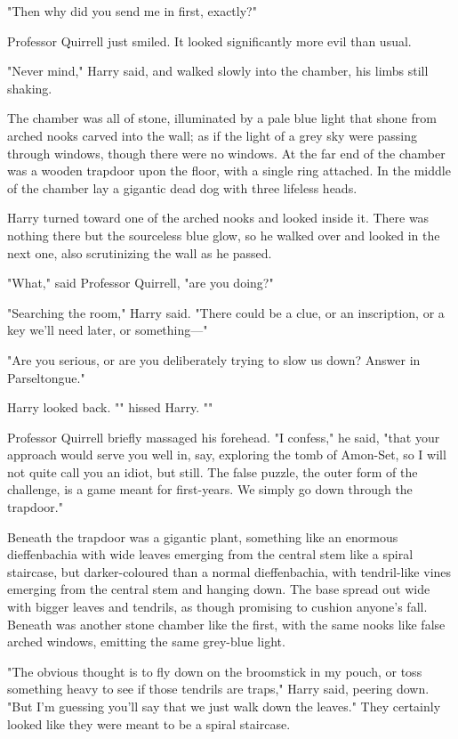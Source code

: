 "Then why did you send me in first, exactly?"

Professor Quirrell just smiled. It looked significantly more evil than usual.

"Never mind," Harry said, and walked slowly into the chamber, his limbs still
shaking.

The chamber was all of stone, illuminated by a pale blue light that shone from
arched nooks carved into the wall; as if the light of a grey sky were passing
through windows, though there were no windows. At the far end of the chamber
was a wooden trapdoor upon the floor, with a single ring attached. In the
middle of the chamber lay a gigantic dead dog with three lifeless heads.

Harry turned toward one of the arched nooks and looked inside it. There was
nothing there but the sourceless blue glow, so he walked over and looked in the
next one, also scrutinizing the wall as he passed.

"What," said Professor Quirrell, "are you doing?"

"Searching the room," Harry said. "There could be a clue, or an inscription, or
a key we'll need later, or something---"

"Are you serious, or are you deliberately trying to slow us down? Answer in
Parseltongue."

Harry looked back. "" hissed Harry. ""

Professor Quirrell briefly massaged his forehead. "I confess," he said, "that
your approach would serve you well in, say, exploring the tomb of Amon-Set, so
I will not quite call you an idiot, but still. The false puzzle, the outer form
of the challenge, is a game meant for first-years. We simply go down through
the trapdoor."

Beneath the trapdoor was a gigantic plant, something like an enormous
dieffenbachia with wide leaves emerging from the central stem like a spiral
staircase, but darker-coloured than a normal dieffenbachia, with tendril-like
vines emerging from the central stem and hanging down. The base spread out wide
with bigger leaves and tendrils, as though promising to cushion anyone's fall.
Beneath was another stone chamber like the first, with the same nooks like
false arched windows, emitting the same grey-blue light.

"The obvious thought is to fly down on the broomstick in my pouch, or toss
something heavy to see if those tendrils are traps," Harry said, peering down.
"But I'm guessing you'll say that we just walk down the leaves." They certainly
looked like they were meant to be a spiral staircase.

